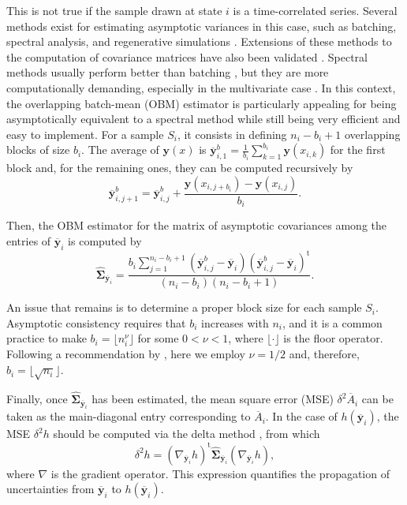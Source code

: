 \documentclass[journal=jctcce,manuscript=article,layout=twocolumn]{achemso}
\newcommand{\mt}[1]{\boldsymbol{\mathbf{#1}}}   %
\newcommand{\vt}[1]{\boldsymbol{\mathbf{#1}}}   %
\newcommand{\tr}[1]{#1^\text{t}}                %
\newcommand{\avg}[1]{\overline{#1}}             %
\begin{document}
This is not true if the sample drawn at state $i$ is a time-correlated series. Several methods exist for estimating asymptotic variances in this case, such as batching, spectral analysis, and regenerative simulations \cite{Geyer_1992, Alexopoulos_2006, Flegal_2010, Doss_2014}. Extensions of these methods to the computation of covariance matrices have also been validated \cite{Vats_2015, Vats_2018}. Spectral methods usually perform better than batching \cite{Flegal_2010}, but they are more computationally demanding, especially in the multivariate case \cite{Vats_2015}. In this context, the overlapping batch-mean (OBM) estimator \cite{Meketon_1984} is particularly appealing for being asymptotically equivalent to a spectral method while still being very efficient and easy to implement. For a sample $S_i$, it consists in defining $n_i-b_i+1$ overlapping blocks of size $b_i$. The average of $\vt y(x)$ is ${\avg{\vt y}}^b_{i,1} = \frac{1}{b_i} \sum_{k=1}^{b_i} \vt y(x_{i,k})$ for the first block and, for the remaining ones, they can be computed recursively by
\begin{equation*}
{\avg{\vt y}}^b_{i,j+1} = {\avg{\vt y}}^b_{i,j} + \frac{\vt y(x_{i,j+b_i}) - \vt y(x_{i,j})}{b_i}.
\end{equation*}

Then, the OBM estimator for the matrix of asymptotic covariances among the entries of $\avg{\vt y}_i$ is computed by \cite{Meketon_1984}
\begin{equation}
\label{eq:obm asymptotic covariance}
\hat{\mt \Sigma}_{\avg{\vt y}_i} = \frac{b_i \sum\limits_{j=1}^{n_i - b_i + 1} ({\avg{\vt y}}^b_{i,j} - \avg{\vt y}_i) \tr{({\avg{\vt y}}^b_{i,j} - \avg{\vt y}_i)}}{(n_i - b_i)(n_i - b_i + 1)}.
\end{equation}

An issue that remains is to determine a proper block size for each sample $S_i$. Asymptotic consistency requires that $b_i$ increases with $n_i$, and it is a common practice to make $b_i = \lfloor n_i^\nu \rfloor$ for some $0 < \nu < 1$, where $\lfloor \cdot \rfloor$ is the floor operator. Following a recommendation by \citeauthor{Flegal_2010} \cite{Flegal_2010}, here we employ $\nu = 1/2$ and, therefore, $b_i = \lfloor \sqrt{n_i} \rfloor$.

Finally, once $\hat{\mt \Sigma}_{\avg{\vt y}_i}$ has been estimated, the mean square error (MSE) $\delta^2 \avg A_i$ can be taken as the main-diagonal entry corresponding to $\avg A_i$. In the case of $h(\avg{\vt y}_i)$, the MSE $\delta^2 h$ should be computed via the delta method \cite{Greene_2012}, from which
\begin{equation}
\label{eq:delta method}
\delta^2 h = \tr{(\nabla_{\avg{\vt y}_i} h)} \hat{\mt \Sigma}_{\avg{\vt y}_i}(\nabla_{\avg{\vt y}_i} h),
\end{equation}
where $\nabla$ is the gradient operator. This expression quantifies the propagation of uncertainties from $\avg{\vt y}_i$ to $h(\avg{\vt y}_i)$.
\end{document}
